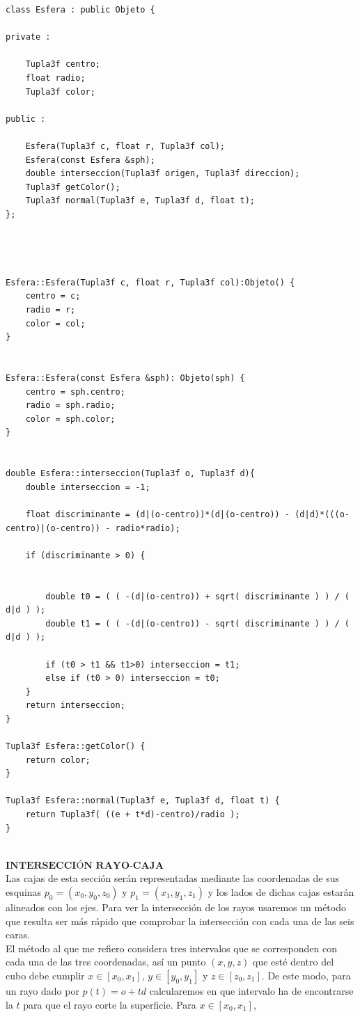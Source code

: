 \begin{lstlisting}[style=Consola]
class Esfera : public Objeto {

private :

	Tupla3f centro;
	float radio;
	Tupla3f color;

public :

	Esfera(Tupla3f c, float r, Tupla3f col);
	Esfera(const Esfera &sph);
	double interseccion(Tupla3f origen, Tupla3f direccion);
	Tupla3f getColor();
	Tupla3f normal(Tupla3f e, Tupla3f d, float t);
};




Esfera::Esfera(Tupla3f c, float r, Tupla3f col):Objeto() {
	centro = c;
	radio = r;
	color = col;
}


Esfera::Esfera(const Esfera &sph): Objeto(sph) {
	centro = sph.centro;
	radio = sph.radio;
	color = sph.color;
}


double Esfera::interseccion(Tupla3f o, Tupla3f d){
	double interseccion = -1;

	float discriminante = (d|(o-centro))*(d|(o-centro)) - (d|d)*(((o-centro)|(o-centro)) - radio*radio);

	if (discriminante > 0) {


		double t0 = ( ( -(d|(o-centro)) + sqrt( discriminante ) ) / ( d|d ) );
		double t1 = ( ( -(d|(o-centro)) - sqrt( discriminante ) ) / ( d|d ) );

		if (t0 > t1 && t1>0) interseccion = t1;
		else if (t0 > 0) interseccion = t0;
	}
	return interseccion;
}

Tupla3f Esfera::getColor() {
	return color;
}

Tupla3f Esfera::normal(Tupla3f e, Tupla3f d, float t) {
	return Tupla3f( ((e + t*d)-centro)/radio );
}
\end{lstlisting}

${ }$\\
$\textbf{INTERSECCIÓN RAYO-CAJA}$
${ }$\\

Las cajas de esta sección serán representadas mediante las coordenadas de sus esquinas $p_0 = (x_0, y_0, z_0)$ y $p_1 = (x_1, y_1, z_1)$ y los lados de dichas cajas estarán alineados con los ejes. Para ver la intersección de los rayos usaremos un método que resulta ser más rápido que comprobar la intersección con cada una de las seis caras.
	${ }$\\	
	
El método al que me refiero considera tres intervalos que se corresponden con cada una de las tres coordenadas, así un punto $(x, y, z)$ que esté dentro del cubo debe cumplir $x \in [x_0, x_1]$, $y \in [y_0, y_1]$ y $z \in [z_0, z_1]$. De este modo, para un rayo dado por $p(t) = o + td$ calcularemos en que intervalo ha de encontrarse la $t$ para que el rayo corte la superficie. Para $x \in [x_0, x_1]$,


